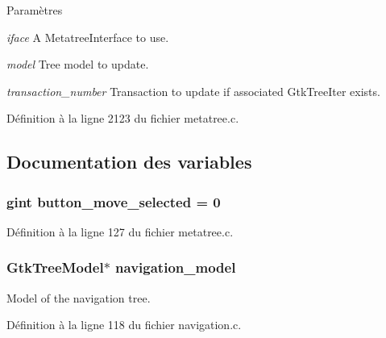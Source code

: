 \begin{DoxyParams}{Paramètres}
\item[{\em iface}]A MetatreeInterface to use. \item[{\em model}]Tree model to update. \item[{\em transaction\_\-number}]Transaction to update if associated GtkTreeIter exists. \end{DoxyParams}


Définition à la ligne 2123 du fichier metatree.c.



\subsection{Documentation des variables}
\subsubsection[{button\_\-move\_\-selected}]{\setlength{\rightskip}{0pt plus 5cm}gint {\bf button\_\-move\_\-selected} = 0}\label{metatree_8c_a59ce65cf86541ffcf8821fa698b5365f}


Définition à la ligne 127 du fichier metatree.c.

\subsubsection[{navigation\_\-model}]{\setlength{\rightskip}{0pt plus 5cm}GtkTreeModel$\ast$ {\bf navigation\_\-model}}\label{metatree_8c_af25f8dd6dec7eb5cb22b4a710e686d29}
Model of the navigation tree. 

Définition à la ligne 118 du fichier navigation.c.

